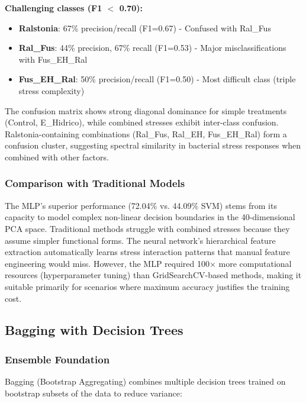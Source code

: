 \documentclass[12pt,a4paper]{article}
\begin{document}
\textbf{Challenging classes (F1 $<$ 0.70):}
\begin{itemize}
    \item \textbf{Ralstonia}: 67\% precision/recall (F1=0.67) - Confused with Ral\_Fus
    \item \textbf{Ral\_Fus}: 44\% precision, 67\% recall (F1=0.53) - Major misclassifications with Fus\_EH\_Ral  
    \item \textbf{Fus\_EH\_Ral}: 50\% precision/recall (F1=0.50) - Most difficult class (triple stress complexity)
\end{itemize}

The confusion matrix shows strong diagonal dominance for simple treatments (Control, E\_Hidrico), while combined stresses exhibit inter-class confusion. Ralstonia-containing combinations (Ral\_Fus, Ral\_EH, Fus\_EH\_Ral) form a confusion cluster, suggesting spectral similarity in bacterial stress responses when combined with other factors.

\subsubsection{Comparison with Traditional Models}

The MLP's superior performance (72.04\% vs. 44.09\% SVM) stems from its capacity to model complex non-linear decision boundaries in the 40-dimensional PCA space. Traditional methods struggle with combined stresses because they assume simpler functional forms. The neural network's hierarchical feature extraction automatically learns stress interaction patterns that manual feature engineering would miss. However, the MLP required 100× more computational resources (hyperparameter tuning) than GridSearchCV-based methods, making it suitable primarily for scenarios where maximum accuracy justifies the training cost.



\subsection{Bagging with Decision Trees}

\subsubsection{Ensemble Foundation}

Bagging (Bootstrap Aggregating) combines multiple decision trees trained on bootstrap subsets of the data to reduce variance:
\end{document}

